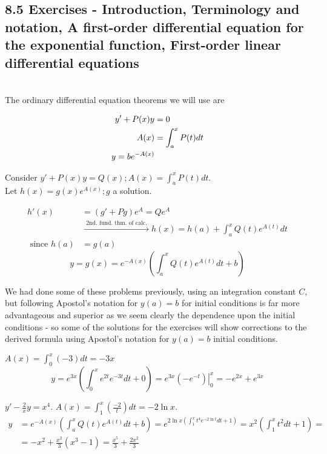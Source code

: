 \documentclass[twoside]{amsart}
\theoremstyle{plain}
\theoremstyle{definition}
\newcommand{\exercisehead}[1]
  {\smallskip
   \noindent{\small\bf Exercise #1.}}
\begin{document}
\subsection*{ 8.5 Exercises - Introduction, Terminology and notation, A first-order differential equation for the exponential function, First-order linear differential equations }
\quad \\
The ordinary differential equation theorems we will use are 

\begin{align}
  y' + P(x) y & = 0 \\ 
  A(x) & = \int_a^x P(t)dt \notag \\
  y = b e^{-A(x)} & 
\end{align}

Consider $y' + P(x)y = Q(x); A(x) = \int_a^x P(t)dt$.  \medskip \\
Let $h(x) = g(x) e^{A(x)}; g$ a solution.

\[
\begin{aligned}
  h'(x) & = (g'+Pg)e^A = Qe^A \\
  & \xrightarrow{ \text{ 2nd. fund. thm. of calc. } } h(x) =h(a) + \int_a^x Q(t) e^{A(t)} dt \\
  \text{ since } h(a) & = g(a) 
\end{aligned}
\]
\begin{equation}
  y = g(x) = e^{-A(x) } \left( \int_a^x Q(t) e^{A(t)} dt + b \right)
\end{equation}

We had done some of these problems previously, using an integration constant $C$, but following Apostol's notation for $y(a)= b$ for initial conditions is far more advantageous and superior as we seem clearly the dependence upon the initial conditions - so some of the solutions for the exercises will show corrections to the derived formula using Apostol's notation for $y(a)=b$ initial conditions.

\exercisehead{1} $A(x) = \int_0^x (-3)dt = -3x$
\[
y = e^{3x} \left( \int_0^x e^{2t} e^{-3t} dt + 0 \right) = e^{3x} \left. (-e^{-t}) \right|_0^x = \boxed{ -e^{2x} + e^{3x} }
\]

\exercisehead{2} $y' - \frac{2}{x} y = x^4$.  $A(x) =\int_1^x \left( \frac{-2}{t} \right) dt = -2\ln{x}$.  
\[
\begin{aligned}
  y & = e^{-A(x)} \left( \int_a^x Q(t) e^{A(t)} dt + b \right) = e^{2\ln{x} \left( \int_1^x t^4 e^{-2\ln{t}} dt + 1 \right)} = x^2 \left( \int_1^x t^2 dt +1 \right) = \\
    & = -x^2 + \frac{x^2}{3} (x^3 -1) = \frac{ x^5}{3} + \frac{2x^2}{3}
\end{aligned}
\]
\end{document}
